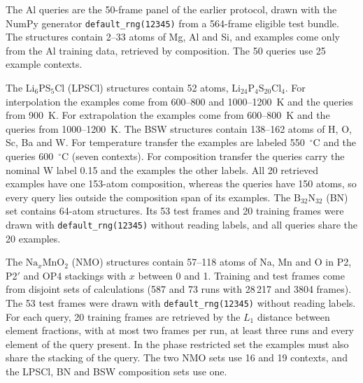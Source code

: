 The Al queries are the 50-frame panel of the earlier protocol, drawn with the NumPy generator \texttt{default\_rng(12345)} from a 564-frame eligible test bundle. The structures contain 2--33 atoms of Mg, Al and Si, and examples come only from the Al training data, retrieved by composition. The 50 queries use 25 example contexts.

The $\mathrm{Li_6PS_5Cl}$ (LPSCl) structures contain 52 atoms, $\mathrm{Li_{24}P_4S_{20}Cl_4}$. For interpolation the examples come from 600--800 and 1000--1200~K and the queries from 900~K. For extrapolation the examples come from 600--800~K and the queries from 1000--1200~K. The BSW structures contain 138--162 atoms of H, O, Sc, Ba and W. For temperature transfer the examples are labeled 550~$^{\circ}$C and the queries 600~$^{\circ}$C (seven contexts). For composition transfer the queries carry the nominal W label 0.15 and the examples the other labels. All 20 retrieved examples have one 153-atom composition, whereas the queries have 150 atoms, so every query lies outside the composition span of its examples. The $\mathrm{B_{32}N_{32}}$ (BN) set contains 64-atom structures. Its 53 test frames and 20 training frames were drawn with \texttt{default\_rng(12345)} without reading labels, and all queries share the 20 examples.

The $\mathrm{Na}_x\mathrm{MnO_2}$ (NMO) structures contain 57--118 atoms of Na, Mn and O in P2, P2$'$ and OP4 stackings with $x$ between 0 and 1. Training and test frames come from disjoint sets of calculations (587 and 73 runs with 28\,217 and 3804 frames). The 53 test frames were drawn with \texttt{default\_rng(12345)} without reading labels. For each query, 20 training frames are retrieved by the $L_1$ distance between element fractions, with at most two frames per run, at least three runs and every element of the query present. In the phase restricted set the examples must also share the stacking of the query. The two NMO sets use 16 and 19 contexts, and the LPSCl, BN and BSW composition sets use one.

